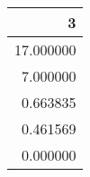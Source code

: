 \begin{tabular}{r}
\toprule
3 \\
\midrule
17.000000 \\
7.000000 \\
0.663835 \\
0.461569 \\
0.000000 \\
\bottomrule
\end{tabular}
